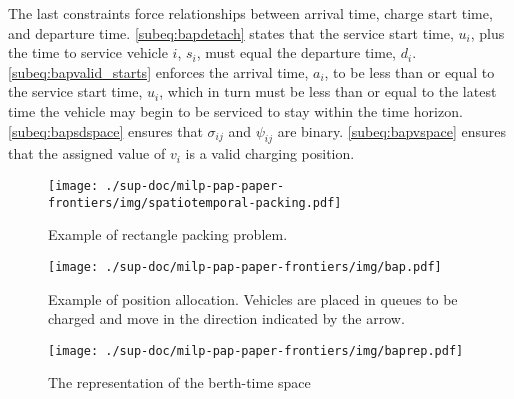\documentclass[11pt,a4paper,final]{article}
\begin{document}
The last constraints force relationships between arrival time, charge start time, and departure time.
\autoref{subeq:bapdetach} states that the service start time, \(u_i\), plus the time to service vehicle \(i\), \(s_i\), must
equal the departure time, \(d_i\). \autoref{subeq:bapvalid_starts} enforces the arrival time, \(a_i\), to be less than or
equal to the service start time, \(u_i\), which in turn must be less than or equal to the latest time the vehicle may
begin to be serviced to stay within the time horizon. \autoref{subeq:bapsdspace} ensures that \(\sigma_{ij}\) and
\(\psi_{ij}\) are binary. \autoref{subeq:bapvspace} ensures that the assigned value of \(v_i\) is a valid charging position.

\begin{figure}[htbp]
\centering
\texttt{[image: ./sup-doc/milp-pap-paper-frontiers/img/spatiotemporal-packing.pdf]}
\caption{\label{fig:packexample}Example of rectangle packing problem.}
\end{figure}

\begin{figure}[htbp]
\centering
\texttt{[image: ./sup-doc/milp-pap-paper-frontiers/img/bap.pdf]}
\caption{\label{subfig:bapexample}Example of position allocation. Vehicles are placed in queues to be charged and move in the direction indicated by the arrow.}
\end{figure}

\begin{figure}[htbp]
\centering
\texttt{[image: ./sup-doc/milp-pap-paper-frontiers/img/baprep.pdf]}
\caption{\label{fig:bap}The representation of the berth-time space}
\end{figure}
\end{document}

